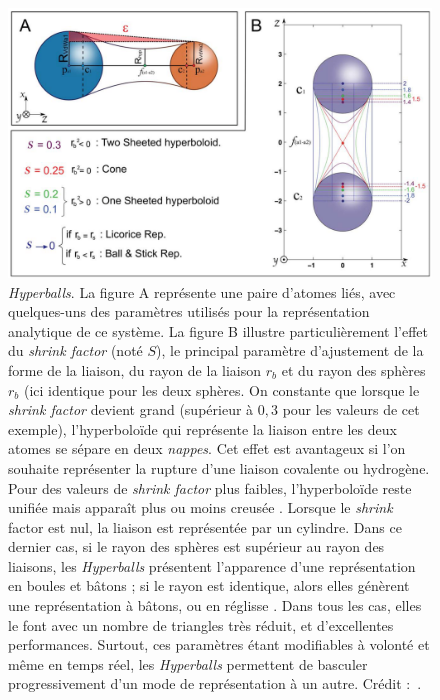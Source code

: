 	\begin{figure}[H]
    	\centering
    	\includegraphics[width=\textwidth]{figures/ch1/hyperballs}
    	\caption{\emph{Hyperballs}. La figure A représente une paire d'atomes liés, avec quelques-uns des paramètres utilisés pour la représentation analytique de ce système. La figure B illustre particulièrement l'effet du \emph{shrink factor} (noté $S$), le principal paramètre d'ajustement de la forme de la liaison, du rayon de la liaison $r_{b}$ et du rayon des sphères $r_{b}$ (ici identique pour les deux sphères. On constante que lorsque le \emph{shrink factor} devient grand (supérieur à $0,3$ pour les valeurs de cet exemple), l'hyperboloïde qui représente la liaison entre les deux atomes se sépare en deux \emph{nappes}. Cet effet est avantageux si l'on souhaite représenter la rupture d'une liaison covalente ou hydrogène. Pour des valeurs de \emph{shrink factor} plus faibles, l'hyperboloïde reste unifiée mais apparaît plus ou moins \og creusée \fg{}. Lorsque le \emph{shrink} factor est nul, la liaison est représentée par un cylindre. Dans ce dernier cas, si le rayon des sphères est supérieur au rayon des liaisons, les \emph{Hyperballs} présentent l'apparence d'une représentation en boules et bâtons ; si le rayon est identique, alors elles génèrent une représentation à bâtons, ou \og en réglisse \fg{}. Dans tous les cas, elles le font avec un nombre de triangles très réduit, et d'excellentes performances. Surtout, ces paramètres étant modifiables à volonté et même en temps réel, les \emph{Hyperballs} permettent de basculer progressivement d'un mode de représentation à un autre. Crédit :~\cite{chavent2011gpu}.}
   		\label{fig:hyperballs}
    \end{figure}
		
